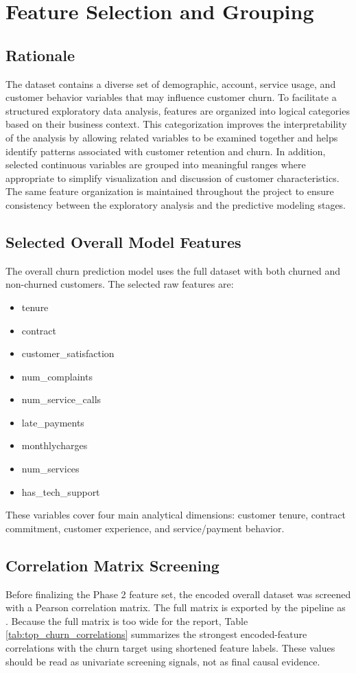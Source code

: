 \section{Feature Selection and Grouping}

\subsection{Rationale}
The dataset contains a diverse set of demographic, account, service usage, and customer behavior variables that may influence customer churn. To facilitate a structured exploratory data analysis, features are organized into logical categories based on their business context. This categorization improves the interpretability of the analysis by allowing related variables to be examined together and helps identify patterns associated with customer retention and churn. In addition, selected continuous variables are grouped into meaningful ranges where appropriate to simplify visualization and discussion of customer characteristics. The same feature organization is maintained throughout the project to ensure consistency between the exploratory analysis and the predictive modeling stages.

\subsection{Selected Overall Model Features}
The overall churn prediction model uses the full dataset with both churned and
non-churned customers. The selected raw features are:
\begin{itemize}
  \item tenure
  \item contract
  \item customer\_satisfaction
  \item num\_complaints
  \item num\_service\_calls
  \item late\_payments
  \item monthlycharges
  \item num\_services
  \item has\_tech\_support
\end{itemize}

These variables cover four main analytical dimensions: customer tenure, contract
commitment, customer experience, and service/payment behavior.

\subsection{Correlation Matrix Screening}
Before finalizing the Phase 2 feature set, the encoded overall dataset was
screened with a Pearson correlation matrix. The full matrix is exported by the
pipeline as . Because the full
matrix is too wide for the report, Table \ref{tab:top_churn_correlations}
summarizes the strongest encoded-feature correlations with the churn target
using shortened feature labels. These values should be read as univariate
screening signals, not as final causal evidence.

